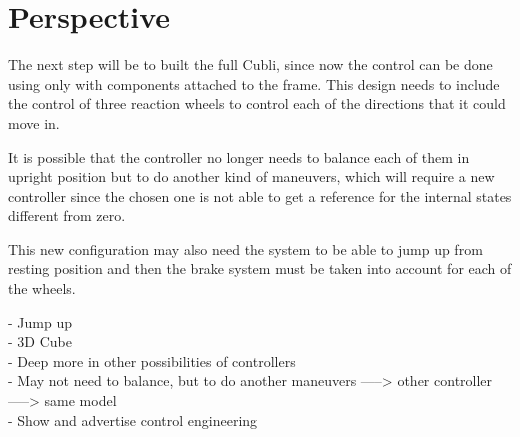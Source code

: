\chapter{Perspective}

The next step will be to built the full Cubli, since now the control can be done using only with components attached to the frame. This design  needs to include the control of three reaction wheels to control each of the directions that it could move in.

It is possible that the controller no longer needs to balance each of them in upright position but to do another kind of maneuvers, which will require a new controller since the chosen one is not able to get a reference for the internal states different from zero.

This new configuration may also need the system to be able to jump up from resting position and then the brake system must be taken into account for each of the wheels. 



- Jump up\\
- 3D Cube\\
- Deep more in other possibilities of controllers\\
- May not need to balance, but to do another maneuvers -----> other controller -----> same model\\
- Show and advertise control engineering \\